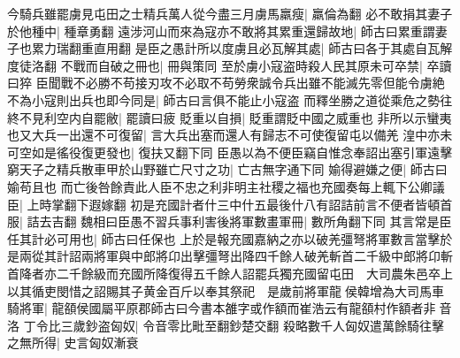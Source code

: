 今騎兵雖罷虜見屯田之士精兵萬人從今盡三月虜馬羸瘦|{
	羸倫為翻}
必不敢捐其妻子於他種中|{
	種章勇翻}
遠涉河山而來為寇亦不敢將其累重還歸故地|{
	師古曰累重謂妻子也累力瑞翻重直用翻}
是臣之愚計所以度虜且必瓦解其處|{
	師古曰各于其處自瓦解度徒洛翻}
不戰而自破之冊也|{
	冊與策同}
至於虜小寇盗時殺人民其原未可卒禁|{
	卒讀曰猝}
臣聞戰不必勝不苟接刃攻不必取不苟勞衆誠令兵出雖不能滅先零但能令虜絶不為小寇則出兵也即今同是|{
	師古曰言俱不能止小寇盗}
而釋坐勝之道從乘危之勢往終不見利空内自罷敝|{
	罷讀曰疲}
貶重以自損|{
	貶重謂貶中國之威重也}
非所以示蠻夷也又大兵一出還不可復留|{
	言大兵出塞而還人有歸志不可使復留屯以備羌}
湟中亦未可空如是徭役復更發也|{
	復扶又翻下同}
臣愚以為不便臣竊自惟念奉詔出塞引軍遠擊窮天子之精兵散車甲於山野雖亡尺寸之功|{
	亡古無字通下同}
媮得避嫌之便|{
	師古曰媮苟且也}
而亡後咎餘責此人臣不忠之利非明主社稷之福也充國奏每上輒下公卿議臣|{
	上時掌翻下遐嫁翻}
初是充國計者什三中什五最後什八有詔詰前言不便者皆頓首服|{
	詰去吉翻}
魏相曰臣愚不習兵事利害後將軍數畫軍冊|{
	數所角翻下同}
其言常是臣任其計必可用也|{
	師古曰任保也}
上於是報充國嘉納之亦以破羌彊弩將軍數言當擊於是兩從其計詔兩將軍與中郎將卬出擊彊弩出降四千餘人破羌斬首二千級中郎將卬斬首降者亦二千餘級而充國所降復得五千餘人詔罷兵獨充國留屯田　大司農朱邑卒上以其循吏閔惜之詔賜其子黄金百斤以奉其祭祀　是歲前將軍龍侯韓增為大司馬車騎將軍|{
	龍頟侯國屬平原郡師古曰今書本雒字或作額而崔浩云有龍頟村作額者非音洛}
丁令比三歲鈔盗匈奴|{
	令音零比毗至翻鈔楚交翻}
殺略數千人匈奴遣萬餘騎往擊之無所得|{
	史言匈奴漸衰}


